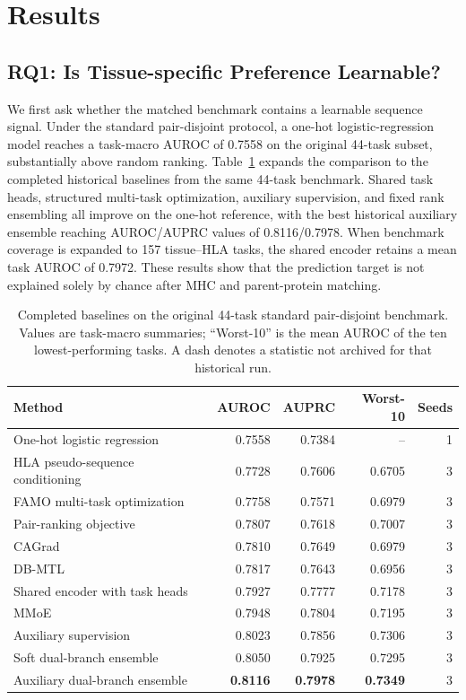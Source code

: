 \section{Results}

\subsection{RQ1: Is Tissue-specific Preference Learnable?}

We first ask whether the matched benchmark contains a learnable sequence signal. Under the standard pair-disjoint protocol, a one-hot logistic-regression model reaches a task-macro AUROC of 0.7558 on the original 44-task subset, substantially above random ranking. Table~\ref{tab:rq1-baselines} expands the comparison to the completed historical baselines from the same 44-task benchmark. Shared task heads, structured multi-task optimization, auxiliary supervision, and fixed rank ensembling all improve on the one-hot reference, with the best historical auxiliary ensemble reaching AUROC/AUPRC values of 0.8116/0.7978. When benchmark coverage is expanded to 157 tissue--HLA tasks, the shared encoder retains a mean task AUROC of 0.7972. These results show that the prediction target is not explained solely by chance after MHC and parent-protein matching.

\begin{table}[tbp]
\centering
\caption{Completed baselines on the original 44-task standard pair-disjoint benchmark. Values are task-macro summaries; ``Worst-10'' is the mean AUROC of the ten lowest-performing tasks. A dash denotes a statistic not archived for that historical run.}
\label{tab:rq1-baselines}
\small
\setlength{\tabcolsep}{4pt}
\begin{tabular}{lrrrr}
\toprule
Method & AUROC & AUPRC & Worst-10 & Seeds \\ 
\midrule
One-hot logistic regression & 0.7558 & 0.7384 & -- & 1 \\ 
HLA pseudo-sequence conditioning & 0.7728 & 0.7606 & 0.6705 & 3 \\ 
FAMO multi-task optimization & 0.7758 & 0.7571 & 0.6979 & 3 \\ 
Pair-ranking objective & 0.7807 & 0.7618 & 0.7007 & 3 \\ 
CAGrad & 0.7810 & 0.7649 & 0.6979 & 3 \\ 
DB-MTL & 0.7817 & 0.7643 & 0.6956 & 3 \\ 
Shared encoder with task heads & 0.7927 & 0.7777 & 0.7178 & 3 \\ 
MMoE & 0.7948 & 0.7804 & 0.7195 & 3 \\ 
Auxiliary supervision & 0.8023 & 0.7856 & 0.7306 & 3 \\ 
Soft dual-branch ensemble & 0.8050 & 0.7925 & 0.7295 & 3 \\ 
Auxiliary dual-branch ensemble & \textbf{0.8116} & \textbf{0.7978} & \textbf{0.7349} & 3 \\ 
\bottomrule
\end{tabular}
\end{table}


